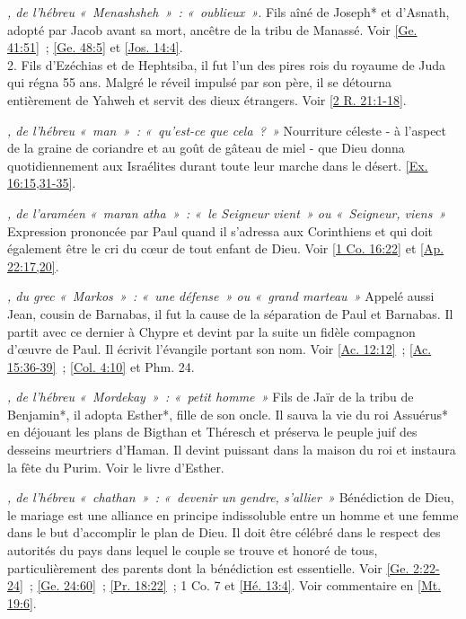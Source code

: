 \begin{multicols}{2}
\textit{, de l'hébreu «~Menashsheh~»~: «~oublieux~»}. Fils aîné de Joseph* et d'Asnath, adopté par Jacob avant sa mort, ancêtre de la tribu de Manassé. Voir \vref{Ge. 41:51}~; \vref{Ge. 48:5} et \vref{Jos. 14:4}.
\\2. Fils d'Ezéchias et de Hephtsiba, il fut l'un des pires rois du royaume de Juda qui régna 55 ans. Malgré le réveil impulsé par son père, il se détourna entièrement de Yahweh et servit des dieux étrangers. Voir \vref{2 R. 21:1-18}.

\textit{, de l'hébreu «~man~»~: «~qu'est-ce que cela~?~»}\newline
Nourriture céleste - à l'aspect de la graine de coriandre et au goût de gâteau de miel - que Dieu donna quotidiennement aux Israélites durant toute leur marche dans le désert. \vref{Ex. 16:15,31-35}.

\textit{, de l'araméen «~maran atha~»~: «~le Seigneur vient~» ou «~Seigneur, viens~»}\newline
Expression prononcée par Paul quand il s'adressa aux Corinthiens et qui doit également être le cri du cœur de tout enfant de Dieu. Voir \vref{1 Co. 16:22} et \vref{Ap. 22:17,20}.

\textit{, du grec «~Markos~»~: «~une défense~» ou «~grand marteau~»}\newline
Appelé aussi Jean, cousin de Barnabas, il fut la cause de la séparation de Paul et Barnabas. Il partit avec ce dernier à Chypre et devint par la suite un fidèle compagnon d'œuvre de Paul. Il écrivit l'évangile portant son nom. Voir \vref{Ac. 12:12}~; \vref{Ac. 15:36-39}~; \vref{Col. 4:10} et Phm. 24.

\textit{, de l'hébreu «~Mordekay~»~: «~petit homme~»}\newline
Fils de Jaïr de la tribu de Benjamin*, il adopta Esther*, fille de son oncle. Il sauva la vie du roi Assuérus* en déjouant les plans de Bigthan et Théresch et préserva le peuple juif des desseins meurtriers d'Haman. Il devint puissant dans la maison du roi et instaura la fête du Purim. Voir le livre d'Esther.

\textit{, de l'hébreu «~chathan~»~: «~devenir un gendre, s'allier~»}\newline
Bénédiction de Dieu, le mariage est une alliance en principe indissoluble entre un homme et une femme dans le but d'accomplir le plan de Dieu. Il doit être célébré dans le respect des autorités du pays dans lequel le couple se trouve et honoré de tous, particulièrement des parents dont la bénédiction est essentielle. Voir \vref{Ge. 2:22-24}~; \vref{Ge. 24:60}~; \vref{Pr. 18:22}~; 1 Co. 7 et \vref{Hé. 13:4}. Voir commentaire en \vref{Mt. 19:6}.


\end{multicols}
